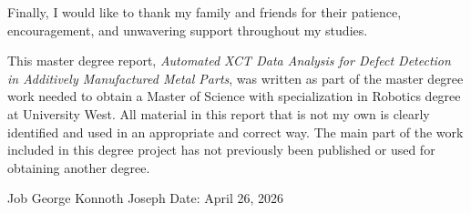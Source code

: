 Finally, I would like to thank my family and friends for their patience, encouragement, and
unwavering support throughout my studies.

\clearpage
{}
This master degree report, \emph{Automated XCT Data Analysis for Defect Detection in Additively
Manufactured Metal Parts}, was written as part of the master degree work needed to obtain a Master of
Science with specialization in Robotics degree at University West. All material in this report that
is not my own is clearly identified and used in an appropriate and correct way. The main part of the
work included in this degree project has not previously been published or used for obtaining another
degree.

\vspace{2cm}
\noindent Job George Konnoth Joseph \hfill Date: April 26, 2026

\clearpage
